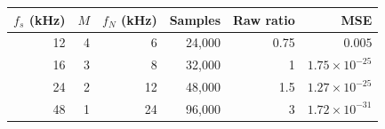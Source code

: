 \begin{tabular}{rrrrrr}
\toprule
$f_s$ (kHz) & $M$ & $f_N$ (kHz) & Samples & Raw ratio & MSE \\
\midrule
12 & 4 & 6 & 24,000 & 0.75 & $0.005$ \\
16 & 3 & 8 & 32,000 & 1 & $1.75\times10^{-25}$ \\
24 & 2 & 12 & 48,000 & 1.5 & $1.27\times10^{-25}$ \\
48 & 1 & 24 & 96,000 & 3 & $1.72\times10^{-31}$ \\
\bottomrule
\end{tabular}
